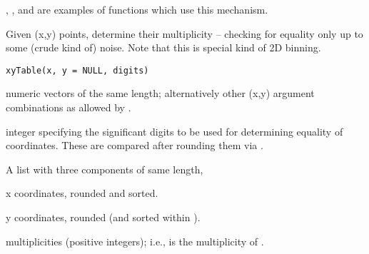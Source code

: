 %
\begin{SeeAlso}\relax
{}, , 
and  are examples of functions which use this mechanism.
\end{SeeAlso}
%
\begin{Examples}
\end{Examples}
%
\begin{Description}\relax
Given (x,y) points, determine their multiplicity -- checking for
equality only up to some (crude kind of) noise.  Note that this is
special kind of 2D binning.
\end{Description}
%
\begin{Usage}
\begin{verbatim}
xyTable(x, y = NULL, digits)
\end{verbatim}
\end{Usage}
%
\begin{Arguments}
\begin{ldescription}
\item[\code{x,y}] numeric vectors of the same length; alternatively other
(x,y) argument combinations as allowed by .
\item[\code{digits}] integer specifying the significant digits to be used for
determining equality of coordinates.  These are compared after
rounding them via .
\end{ldescription}
\end{Arguments}
%
\begin{Value}
A list with three components of same length,
\begin{ldescription}
\item[\code{x}] x coordinates, rounded and sorted.
\item[\code{y}] y coordinates, rounded (and sorted within ).
\item[\code{number}] multiplicities (positive integers); i.e.,
 is the multiplicity of .
\end{ldescription}
\end{Value}
